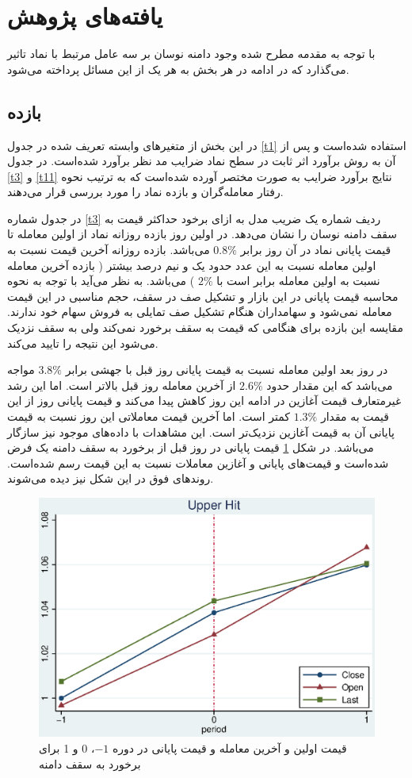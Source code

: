 \documentclass[12pt]{article}
\begin{document}
\section{یافته‌های پژوهش}
با توجه به مقدمه مطرح شده وجود دامنه نوسان بر سه عامل مرتبط با نماد تاثیر می‌گذارد که در ادامه در هر بخش به هر یک از این مسائل پرداخته می‌شود.

\subsection{بازده}
در این بخش از متغیر‌های وابسته تعریف شده در جدول 
\ref{t1}
استفاده شده‌است و پس از آن به روش برآورد اثر ثابت در سطح نماد ضرایب مد نظر برآورد شده‌است. در جدول 
\ref{t3}
و
\ref{t11}
نتایج برآورد ضرایب به صورت مختصر آورده شده‌است که به ترتیب نحوه رفتار معامله‌گران و بازده نماد را مورد بررسی قرار می‌دهند.

در جدول شماره
\ref{t3}
ردیف شماره یک ضریب مدل به ازای برخود حداکثر قیمت به سقف دامنه نوسان را نشان می‌دهد. در اولین روز بازده روزانه نماد از اولین معامله تا قیمت پایانی نماد در آن روز برابر 
$ 0.8\% $
می‌باشد. بازده روزانه آخرین قیمت نسبت به اولین معامله نسبت به این عدد حدود یک و نیم درصد بیشتر ( بازده آخرین معامله نسبت به اولین معامله برابر است با 
$ 2\% $
) می‌باشد. به نظر می‌آید با توجه به نحوه محاسبه قیمت پایانی در این بازار و تشکیل صف در سقف، حجم مناسبی در این قیمت معامله نمی‌شود و سهامداران هنگام تشکیل صف تمایلی به فروش سهام خود ندارند. مقایسه این بازده برای هنگامی که قیمت به سقف برخورد نمی‌کند ولی به سقف نزدیک می‌شود  این نتیجه را تایید می‌کند.

در روز بعد اولین معامله نسبت به قیمت پایانی روز قبل با جهشی برابر 
$ 3.8\% $
مواجه می‌باشد که این مقدار حدود 
$ 2.6\% $
از آخرین معامله روز قبل بالا‌تر است. اما این رشد غیرمتعارف قیمت آغازین در ادامه این روز کاهش پیدا می‌کند و قیمت پایانی روز از این قیمت به مقدار 
$ 1.3\% $
کمتر است. اما آخرین قیمت معاملاتی این روز نسبت به قیمت پایانی آن به قیمت آغازین نزدیک‌تر است.
این مشاهدات با داده‌های موجود نیز سازگار می‌باشد. در شکل 
\ref{g10}
قیمت پایانی در روز قبل از برخورد به سقف دامنه یک فرض شده‌است و قیمت‌های پایانی و آغازین معاملات نسبت به این قیمت رسم شده‌است.
روند‌های فوق در این شکل نیز دیده می‌شوند.


 \begin{figure}[htbp]
 \centering
 \includegraphics[width=0.8\columnwidth]{DUT.eps}
 \caption{ قیمت اولین  و آخرین معامله و قیمت پایانی در دوره 
  $ -1 $،
  0 
  و 
  1 
  برای برخورد به سقف دامنه}
 \label{g10}
 \end{figure}
 
\end{document}
